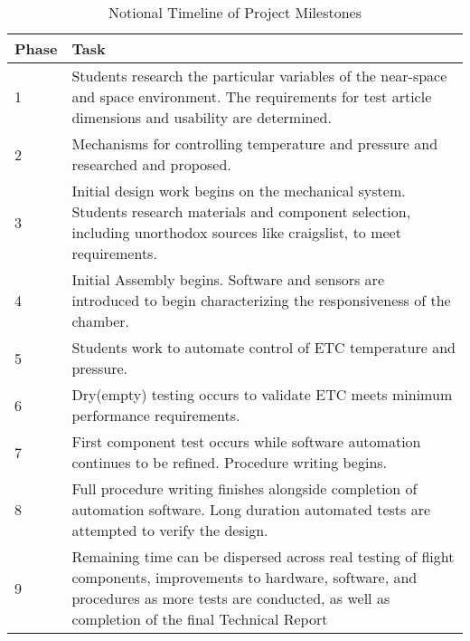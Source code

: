 \documentclass[conference]{IEEEtran} %
\begin{document}
  \begin{table}[hb!]
        \caption{Notional Timeline of Project Milestones}
        \centering
        \begin{tabularx}{\linewidth}{lX}
            \toprule %
            Phase & Task  \\
            \midrule %
            1 & Students research the particular variables of the near-space and space environment. The requirements for test article dimensions and usability are determined. \\
            2 & Mechanisms for controlling temperature and pressure and researched and proposed. \\
            3 & Initial design work begins on the mechanical system. Students research materials and component selection, including unorthodox sources like craigslist, to meet requirements. \\
            4 & Initial Assembly begins. Software and sensors are introduced to begin characterizing the responsiveness of the chamber. \\
            5 & Students work to automate control of ETC temperature and pressure. \\
            6 & Dry(empty) testing occurs to validate ETC meets minimum performance requirements. \\
            7 & First component test occurs while software automation continues to be refined. Procedure writing begins. \\
            8 & Full procedure writing finishes alongside completion of automation software. Long duration automated tests are attempted to verify the design. \\
            9 & Remaining time can be dispersed across real testing of flight components, improvements to hardware, software, and procedures as more tests are conducted, as well as completion of the final Technical Report \\
            \bottomrule
        \end{tabularx}
    \label{tab:timeline1}
    \end{table}
\end{document}

